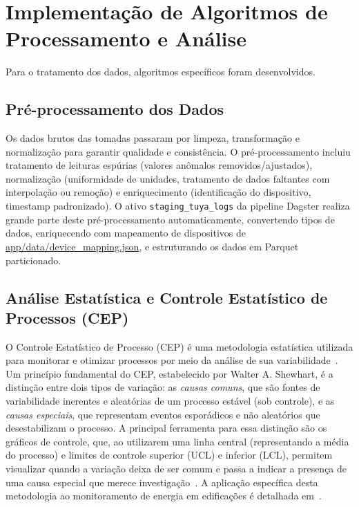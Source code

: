 \section[Algoritmos de Processamento e Análise]{Implementação de Algoritmos de Processamento e Análise}
Para o tratamento dos dados, algoritmos específicos foram desenvolvidos.

\subsection{Pré-processamento dos Dados}
Os dados brutos das tomadas passaram por limpeza, transformação e normalização para garantir qualidade e consistência. O pré-processamento incluiu tratamento de leituras espúrias (valores anômalos removidos/ajustados), normalização (uniformidade de unidades, tratamento de dados faltantes com interpolação ou remoção) e enriquecimento (identificação do dispositivo, timestamp padronizado). O ativo \texttt{staging\_tuya\_logs} da pipeline Dagster realiza grande parte deste pré-processamento automaticamente, convertendo tipos de dados, enriquecendo com mapeamento de dispositivos de \url{app/data/device_mapping.json}, e estruturando os dados em Parquet particionado.

\subsection{Análise Estatística e Controle Estatístico de Processos (CEP)}
\label{subsec:analise_cep}
O Controle Estatístico de Processo (CEP) é uma metodologia estatística utilizada para monitorar e otimizar processos por meio da análise de sua variabilidade~\cite{Montgomery2020SQC}. Um princípio fundamental do CEP, estabelecido por Walter A. Shewhart, é a distinção entre dois tipos de variação: as \textit{causas comuns}, que são fontes de variabilidade inerentes e aleatórias de um processo estável (sob controle), e as \textit{causas especiais}, que representam eventos esporádicos e não aleatórios que desestabilizam o processo. A principal ferramenta para essa distinção são os gráficos de controle, que, ao utilizarem uma linha central (representando a média do processo) e limites de controle superior (UCL) e inferior (LCL), permitem visualizar quando a variação deixa de ser comum e passa a indicar a presença de uma causa especial que merece investigação~\cite{Montgomery2020SQC}. A aplicação específica desta metodologia ao monitoramento de energia em edificações é detalhada em~\cite{Braga2013SPCBuildingEnergy}.

